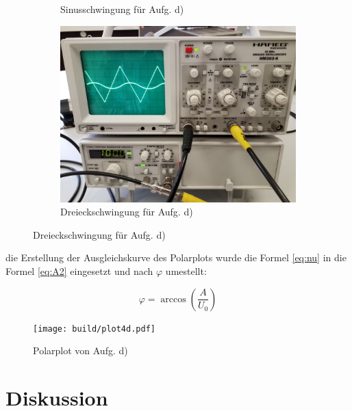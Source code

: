\begin{figure}[H]
\begin{subfigure}{0.48\linewidth}
      \centering
      \caption{Sinusschwingung für Aufg. d)}
      \label{fig:sinus}
    \end{subfigure}
    \begin{subfigure}{0.48\linewidth}
      \vspace{5mm}
      \centering
      \includegraphics[width=\textwidth]{images/dreieck.jpg}
      \caption{Dreieckschwingung für Aufg. d)} 
      \label{fig:dreieck} 
    \end{subfigure}
  
  \label{fig:schwingungen}
  \end{figure}

\newpage
{} \justifying die Erstellung der Ausgleichskurve des Polarplots wurde die Formel \eqref{eq:nu}
in die Formel \eqref{eq:A2} eingesetzt und nach $\varphi$ umestellt:

\begin{equation}
  \varphi = \arccos \left(\frac{A}{U_0}\right) \label{eq:phi}
\end{equation}

  \begin{figure}[H]
    \texttt{[image: build/plot4d.pdf]}
    \centering
    \caption{Polarplot von Aufg. d)}
    \label{fig:4d}
  \end{figure}
  

\section{Diskussion}\justifying

